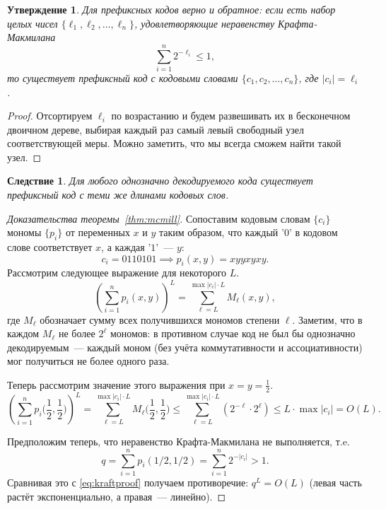 \documentclass[12pt]{article}
\newcommand{\sshalf}{{\textstyle\frac12}}
\newcommand{\seqn}[2]{{#1}_1,{#1}_2,\dotsc,{#1}_{#2}}
\theoremstyle{definition}
\theoremstyle{plain}
\newtheorem{statement}{Утверждение}[section]
\newtheorem{corollary}{Следствие}[section]
\theoremstyle{remark}
\begin{document}
\begin{statement}
    Для префиксных кодов верно и обратное: если есть набор целых чисел
    \(\{\seqn{\ell}{n}\}\),
    удовлетворяющие неравенству Крафта-Макмилана
    \[
        \sum_{i=1}^{n} 2^{-\ell_i} \le 1,
    \]
    то существует префиксный код с кодовыми
    словами \(\{\seqn{c}{n}\}\), где \(|c_i| = \ell_i\).
\end{statement}
\begin{proof}
    Отсортируем $\ell_i$ по возрастанию и будем развешивать их в бесконечном
    двоичном дереве, выбирая каждый раз самый левый свободный узел
    соответствующей меры. Можно заметить, что мы всегда сможем найти такой узел.
\end{proof}
\begin{corollary}
    Для любого однозначно декодируемого кода существует префиксный код с теми же
    длинами кодовых слов.
\end{corollary}

\begin{proof}[Доказательства теоремы~\ref{thm:mcmill}]
    Сопоставим кодовым словам $\{c_i\}$ мономы $\{p_i\}$ от переменных $x$ и $y$ таким 
    образом, что каждый '$0$' в кодовом слове соответствует $x$, а каждая '$1$'~--- $y$:
    \[
        c_i = 0110101 \implies p_i(x,y) = xyyxyxy.
    \]
    Рассмотрим следующее выражение для некоторого $L$.
    \[
        \left( \sum_{i=1}^n p_i(x,y) \right)^L = \sum_{\ell=L}^{\max|c_i| \cdot
        L} M_\ell(x,y),
    \]
    где $M_\ell$ обозначает сумму всех получившихся мономов степени $\ell$.
    Заметим, что в каждом $M_\ell$ не более $2^\ell$ мономов: в противном
    случае код не был бы однозначно декодируемым~--- каждый моном (без учёта
    коммутативности и ассоциативности) мог получиться не более одного раза.
    
    Теперь рассмотрим значение этого выражения при \(x = y = \frac12\).
    \begin{equation}\label{eq:kraftproof}
        \left( \sum_{i=1}^n p_i\bigl(\sshalf,\sshalf\bigr) \right)^L =
        \sum_{\ell=L}^{\max|c_i| \cdot L} M_\ell\bigl(\sshalf,\sshalf\bigr) \le 
        \sum_{\ell=L}^{\max|c_i| \cdot L} (2^{-\ell} \cdot 2^\ell) \le 
        L\cdot\max|c_i| = O(L).
    \end{equation}

    Предположим теперь, что неравенство Крафта-Макмилана не выполняется, т.e.
    \[
        q = \sum_{i=1}^n p_i(1/2,1/2) = \sum_{i=1}^n 2^{-|c_i|} > 1.
    \]
    Сравнивая это с \eqref{eq:kraftproof} получаем противоречие:
    \(
        q^L = O(L)    
    \) 
    (левая часть растёт экспоненциально, а правая~— линейно).
\end{proof}
\end{document}
